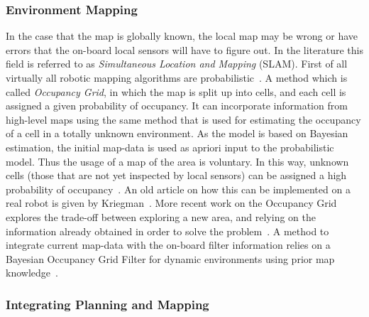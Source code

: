 \subsubsection{Environment Mapping}

In the case that the map is globally known, the local map may be wrong or have
errors that the on-board local sensors will have to figure out. In the
literature this field is referred to as \textit{Simultaneous Location and
  Mapping} (SLAM). First of all virtually all robotic mapping algorithms are
probabilistic~\cite{thrunRoboticMappingSurvey}. A method which is called
\textit{Occupancy Grid}, in which the map is split up into cells, and each cell
is assigned a given probability of occupancy. It can incorporate information
from high-level maps using the same method that is used for estimating the
occupancy of a cell in a totally unknown environment. As the model is based on
Bayesian estimation, the initial map-data is used as apriori input to the
probabilistic model. Thus the usage of a map of the area is voluntary. In this
way, unknown cells (those that are not yet inspected by local sensors) can be
assigned a high probability of occupancy~\cite{elfes1989using}. An old article
on how this can be implemented on a real robot is given by
Kriegman~\cite{kriegman1987mobile}. More recent work on the Occupancy Grid
explores the trade-off between exploring a new area, and relying on the
information already obtained in order to solve the problem~\cite{7139224}. A
method to integrate current map-data with the on-board filter information relies
on a Bayesian Occupancy Grid Filter for dynamic environments using prior map
knowledge~\cite{gindeleBayesianOccupancyGrid2009}.

\subsubsection{Integrating Planning and Mapping}

